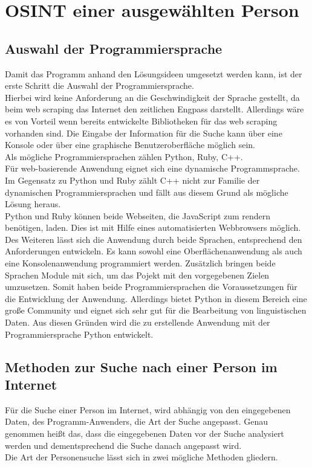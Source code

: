 
\chapter{OSINT einer ausgewählten Person}  %
\label{cha:Informationsbeschaffung einer ausgewählten Person} %

\section{Auswahl der Programmiersprache}
Damit das Programm anhand den Lösungsideen umgesetzt werden kann, ist der erste Schritt die Auswahl der Programmiersprache.\\
Hierbei wird keine Anforderung an die Geschwindigkeit der Sprache gestellt, da beim web scraping das Internet den zeitlichen Engpass darstellt. Allerdings wäre es von Vorteil wenn bereits entwickelte Bibliotheken für das web scraping vorhanden sind. Die Eingabe der Information für die Suche kann über eine Konsole oder über eine graphische Benutzeroberfläche möglich sein.\\
Als mögliche Programmiersprachen zählen Python, Ruby, C++.\\
Für web-basierende Anwendung eignet sich eine dynamische Programmsprache.
Im Gegensatz zu Python und Ruby zählt C++ nicht zur Familie der dynamischen Programmiersprachen und fällt aus diesem Grund als mögliche Lösung heraus. \\
Python und Ruby können beide Webseiten, die JavaScript zum rendern benötigen, laden. Dies ist mit Hilfe eines automatisierten Webbrowsers möglich. Des Weiteren lässt sich die Anwendung durch beide Sprachen, entsprechend den Anforderungen entwickeln. Es kann sowohl eine Oberflächenanwendung als auch eine Konsolenanwendung programmiert werden. Zusätzlich bringen beide Sprachen Module mit sich, um das Pojekt mit den vorgegebenen Zielen umzusetzen. Somit haben beide Programmiersprachen die Voraussetzungen für die Entwicklung der Anwendung. Allerdings bietet Python in diesem Bereich eine große Community und eignet sich sehr gut für die Bearbeitung von linguistischen Daten. \cite{bird2009natural}
Aus diesen Gründen wird die zu erstellende Anwendung mit der Programmiersprache Python entwickelt.


	
\section{Methoden zur Suche nach einer Person im Internet}
\label{sec:Suche nach Information}
Für die Suche einer Person im Internet, wird abhängig von den eingegebenen Daten, des Programm-Anwenders, die Art der Suche angepasst. Genau genommen heißt das, dass die eingegebenen Daten vor der Suche analysiert werden und dementsprechend die Suche danach angepasst wird. \\
Die Art der Personensuche lässt sich in zwei mögliche Methoden gliedern.


